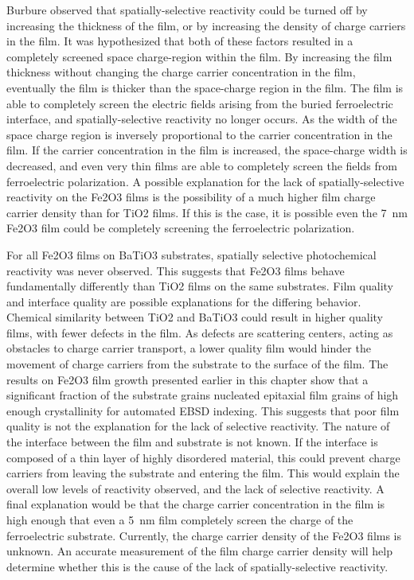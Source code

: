 \documentclass[12pt,%
              twoside,
               letterpaper]{uiothesis}
\begin{document}
Burbure observed that spatially-selective reactivity could be turned off by increasing the thickness of the film, or by increasing the density of charge carriers in the film. It was hypothesized that both of these factors resulted in a completely screened space charge-region within the film. By increasing the film thickness without changing the charge carrier concentration in the film, eventually the film is thicker than the space-charge region in the film. The film is able to completely screen the electric fields arising from the buried ferroelectric interface, and spatially-selective reactivity no longer occurs. As the width of the space charge region is inversely proportional to the carrier concentration in the film. If the carrier concentration in the film is increased, the space-charge width is decreased, and even very thin films are able to completely screen the fields from ferroelectric polarization. A possible explanation for the lack of spatially-selective reactivity on the Fe2O3 films is the possibility of a much higher film charge carrier density than for TiO2 films. If this is the case, it is possible even the \SI{7}{\nano\meter} Fe2O3 film could be completely screening the ferroelectric polarization. 

For all Fe2O3 films on BaTiO3 substrates, spatially selective photochemical reactivity was never observed. This suggests that Fe2O3 films behave fundamentally differently than TiO2 films on the same substrates. Film quality and interface quality are possible explanations for the differing behavior. Chemical similarity between TiO2 and BaTiO3 could result in higher quality films, with fewer defects in the film. As defects are scattering centers, acting as obstacles to charge carrier transport, a lower quality film would hinder the movement of charge carriers from the substrate to the surface of the film. The results on Fe2O3 film growth presented earlier in this chapter show that a significant fraction of the substrate grains nucleated epitaxial film grains of high enough crystallinity for automated EBSD indexing. This suggests that poor film quality is not the explanation for the lack of selective reactivity. The nature of the interface between the film and substrate is not known. If the interface is composed of a thin layer of highly disordered material, this could prevent charge carriers from leaving the substrate and entering the film. This would explain the overall low levels of reactivity observed, and the lack of selective reactivity. A final explanation would be that the charge carrier concentration in the film is high enough that even a \SI{5}{\nano\meter} film completely screen the charge of the ferroelectric substrate. Currently, the charge carrier density of the Fe2O3 films is unknown. An accurate measurement of the film charge carrier density will help determine whether this is the cause of the lack of spatially-selective reactivity.
\end{document}
